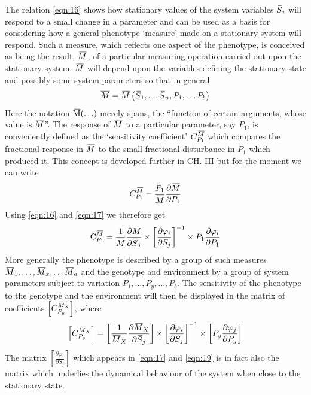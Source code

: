 %
The relation \eqref{eqn:16} shows how stationary values of the system variables $\,\overline{\!{S}}_{i}$ will respond to a small change in a parameter and can be used as a basis for considering how a general phenotype `measure' made on a stationary system will respond. Such a measure, which reflects one aspect of the phenotype, is conceived as being the result, $\,\overline{\!{M}}$, of a particular measuring operation carried out upon the stationary system. $\,\overline{\!{M}}$ will depend upon the variables defining the stationary state and possibly some system parameters so that in general
%
\begin{equation}
\overline{M}=\,\overline{\!{M}}\left(\,\overline{\!{S}}_{1}, \ldots \,\overline{\!{S}}_{n}, P_{1}, \ldots P_{b}\right)
\label{eqn:17}
\end{equation}
%
Here the notation $\,\overline{\!{\mathrm{M}}}(\ldots)$ merely spans, the ``function of certain arguments, whose value is $\,\overline{\!{M}}$''. The response of $\,\overline{\!{M}}$ to a particular parameter, say $P_{1}$, is conveniently defined as the `sensitivity coefficient' $C_{P_{1}}^{\,\overline{\!{M}}}$ which compares the fractional response in $\,\overline{\!{M}}$ to the small fractional disturbance in $P_{1}$ which produced it. This concept is developed further in CH. III but for the moment we can write
%
$$ C^{\,\overline{\!{M}}}_{P_1} = \frac{P_1}{\,\overline{\!{M}}} \frac{\partial \,\overline{\!{M}}}{\partial P_1} $$
%
Using \eqref{eqn:16} and \eqref{eqn:17} we therefore get
%
\begin{equation}
\mathrm{C}_{P_1}^{\olsi{M}} = \frac{1}{\olsi{M}} \frac{\partial M}{\partial \olsi{S}_{j}} \times\left[\frac{\partial \varphi_{i}}{\partial S_{j}}\right]^{-1} \times P_{1} \frac{\partial \varphi_{i}}{\partial P_{1}}
\label{eqn:18}
\end{equation}
%
More generally the phenotype is described by a group of such measures $\,\overline{\!{M}}_{1}, \ldots, \,\overline{\!{M}}_{x}, \ldots \,\overline{\!{M}}_{a}$ and the genotype and environment by a group of system parameters subject to variation $P_{1}, \ldots, P_{y}, \ldots, P_{b}$. The sensitivity of the phenotype to the genotype and the environment will then be displayed in the matrix of coefficients $\left[C_{P_{y}}^{\,\overline{\!{M_{X}}}}\right]$, where
%
\begin{equation}
\left[C_{P_{y}}^{\olsi{M}_{X}} \right]=\left[\frac{1}{\olsi{M}_{X}} \frac{\partial \olsi{M}_{X}}{\partial \olsi{S}_{j}}\right] \times\left[\frac{\partial \varphi_{i}}{\partial S_{j}}\right]^{-1}  \times\left[P_{y} \frac{\partial \varphi_{j}}{\partial P_{y}}\right]
\label{eqn:19}
\end{equation}
%
The matrix $\left[\frac{\partial \varphi_{i}}{\partial S_{j}}\right]$ which appears in \eqref{eqn:17} and \eqref{eqn:19} is in fact also the matrix which underlies the dynamical behaviour of the system when close to the stationary state.

